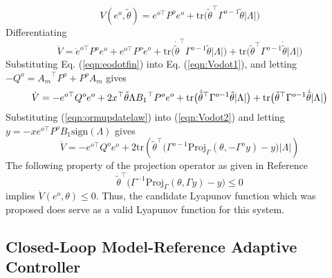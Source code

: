 \begin{equation}
  V(e^{o},\tilde{\theta})=e^{o\top}P^{o}e^{o}+\text{tr}\bigr(\tilde{\theta}^{\top}\Gamma^{o-1}\tilde{\theta}|\Lambda|\bigr)
\end{equation}
Differentiating
\begin{equation}
  \label{eqn:Vodot1}
  \dot{V}={\dot{e}}^{o\top}P^{o}e^{o}+e^{o\top}P^{o}\dot{e}^{o}+
  \text{tr}\bigr(\dot{\tilde{\theta}}^{\top}\Gamma^{o-1}\tilde{\theta}|\Lambda|\bigr)
  +\text{tr}\bigr({\tilde{\theta}}^{\top}\Gamma^{o-1}\dot{\tilde{\theta}}|\Lambda|\bigr)
\end{equation}
Substituting Eq. (\ref{eqn:eodotfin}) into Eq. (\ref{eqn:Vodot1}), and letting $-Q^{o}={A_{m}}^{\top}P^{o}+P^{o}A_{m}$ gives
\begin{equation}
  \label{eqn:Vodot2}
  \dot{V}=-e^{o\top}Q^{o}e^{o}+2x^{\top}{\tilde{\theta}}\Lambda{B_{1}}^{\top}P^{o}e^{o}
  +\text{tr}\bigr(\dot{\tilde{\theta}}^{\top}\Gamma^{o-1}\tilde{\theta}|\Lambda|\bigr)
  +\text{tr}\bigr({\tilde{\theta}}^{\top}\Gamma^{o-1}\dot{\tilde{\theta}}|\Lambda|\bigr) \\
\end{equation}
Substituting (\ref{eqn:ormupdatelaw}) into (\ref{eqn:Vodot2}) and letting $y=-xe^{o\top}P^{o}B_{1}\text{sign}(\Lambda)$ gives
\begin{equation}
  \dot{V}=-e^{o\top}Q^{o}e^{o}
  +2\text{tr}\left(\tilde{\theta}^{\top}\bigr(\Gamma^{o-1}\text{Proj}_{\Gamma}(\theta,-\Gamma^{o}y)-y\bigr)|\Lambda|\right)
\end{equation}
The following property of the projection operator as given in Reference\ \cite{lavretskywise.book.2013}
\begin{equation}
  \tilde{\theta}^{\top}\bigr(\Gamma^{-1}\text{Proj}_{\Gamma}(\theta,\Gamma y)-y\bigr)\leq 0
\end{equation}
implies $\dot{V}(e^{o},\theta)\leq 0$.
Thus, the candidate Lyapunov function which was proposed does serve as a valid Lyapunov function for this system.

\subsection{Closed-Loop Model-Reference Adaptive Controller}\label{sec:crmmrac}

